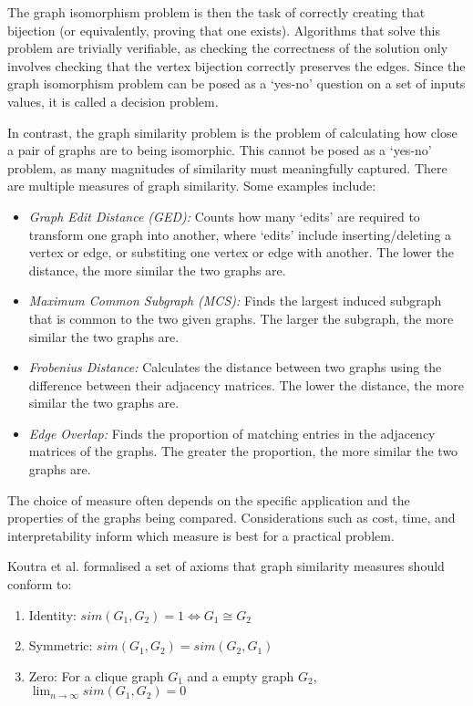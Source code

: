 The graph isomorphism problem is then the task of correctly creating that bijection (or equivalently, proving that one exists). Algorithms that solve this problem are trivially verifiable, as checking the correctness of the solution only involves checking that the vertex bijection correctly preserves the edges. Since the graph isomorphism problem can be posed as a `yes-no' question on a set of inputs values, it is called a decision problem.

In contrast, the graph similarity problem is the problem of calculating how close a pair of graphs are to being isomorphic. This cannot be posed as a `yes-no' problem, as many magnitudes of similarity must meaningfully captured. There are multiple measures of graph similarity. Some examples include:

\begin{itemize}
    \item \textit{Graph Edit Distance (GED):} Counts how many `edits' are required to transform one graph into another, where `edits' include inserting/deleting a vertex or edge, or substiting one vertex or edge with another. The lower the distance, the more similar the two graphs are.
    \item \textit{Maximum Common Subgraph (MCS):} Finds the largest induced subgraph that is common to the two given graphs. The larger the subgraph, the more similar the two graphs are.
    \item \textit{Frobenius Distance:} Calculates the distance between two graphs using the difference between their adjacency matrices. The lower the distance, the more similar the two graphs are.
    \item \textit{Edge Overlap:} Finds the proportion of matching entries in the adjacency matrices of the graphs. The greater the proportion, the more similar the two graphs are.\cite{QAOA_graph_sim}
\end{itemize}

The choice of measure often depends on the specific application and the properties of the graphs being compared. Considerations such as cost, time, and interpretability inform which measure is best for a practical problem.

Koutra et al. \cite{deltacon} formalised a set of axioms that graph similarity measures should conform to: 
\begin{enumerate}
    \item Identity: $sim(G_{1},G_{2})=1 \iff G_{1} \cong G_{2}$ \label{axiom:1}
    \item Symmetric:  $sim(G_{1},G_{2})=sim(G_{2},G_{1})$ \label{axiom:2}
    \item Zero: For a clique graph $G_{1}$ and a empty graph $G_{2}$, 
    $\lim_{n \to \infty} sim(G_{1},G_{2}) = 0$ \label{axiom:3}
\end{enumerate}

